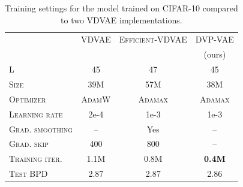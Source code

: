 \begin{table}[t]
    \centering
    \caption{Training settings for the model trained on CIFAR-10 compared to two VDVAE implementations. 
    }
    \label{tab:ablation_stability}
    \begin{tabular}{l|ccc}
        \toprule
         & \small{\textsc{VDVAE}} & \small{\textsc{Efficient-VDVAE}} &\small{\textsc{DVP-VAE}} \\
         & \footnotesize{\citep{Child2020-ze}} & \footnotesize{\citep{hazami2022efficientvdvae}}&\footnotesize{(ours)}\\
        \midrule
        \textsc{L} & 45 & 47 & 45 \\
        \textsc{Size} & 39M & 57M & 38M \\
        \textsc{Optimizer} & \textsc{AdamW} & \textsc{Adamax} & \textsc{Adamax}\\
        \textsc{Learning rate} & 2e-4 & 1e-3 & 1e-3\\
        \textsc{Grad. smoothing} & -- & Yes & --\\
        \textsc{Grad. skip} & 400 & 800 & --\\
        \textsc{Training iter.} & 1.1M & 0.8M &\textbf{0.4M} \\
        \midrule
        \textsc{Test BPD} & 2.87 & 2.87 &2.86 \\
        \bottomrule
    \end{tabular}
    \vskip 20pt
\end{table}



